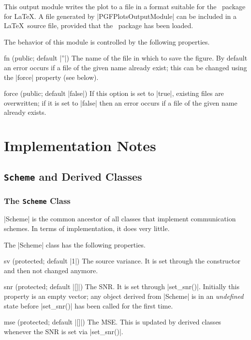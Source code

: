 This output module writes the plot to a file in a format suitable for the
\pgfplots\ package for \LaTeX. A file generated by |PGFPlotsOutputModule| can be
included in a \LaTeX\ source file, provided that the \pgfplots\ package has been
loaded. 

The behavior of this module is controlled by the following properties.
\begin{property}{fn (public; default |''|)}
  The name of the file in which to save the figure. By
  default an error occurs if a file of the given name already exist; this can
  be changed using the |force| property (see below).
\end{property}

\begin{property}{force (public; default |false|)}
   If this option is set to |true|, existing files are
  overwritten; if it is set to |false| then an error occurs if a file of the
  given name already exists.
\end{property}


%
%
%


\section{Implementation Notes}

\subsection{\texttt{Scheme} and Derived Classes}

\subsubsection{The \texttt{Scheme} Class}

|Scheme| is the common ancestor of all classes that implement communication
schemes. In terms of implementation, it does very little. 

The |Scheme| class has the following properties.
\begin{property}{sv (protected; default |1|)}
  The source variance. It is set through the constructor and then not
  changed anymore.
\end{property}
\begin{property}{snr (protected; default |[]|)}
  The SNR. It is set through |set_snr()|. Initially this property is an empty
  vector; any object derived from |Scheme| is in an \emph{undefined} state
  before |set_snr()| has been called for the first time.
\end{property}
\begin{property}{mse (protected; default |[]|)}
  The MSE. This is updated by derived classes whenever the SNR is set
  via |set_snr()|.
\end{property}

